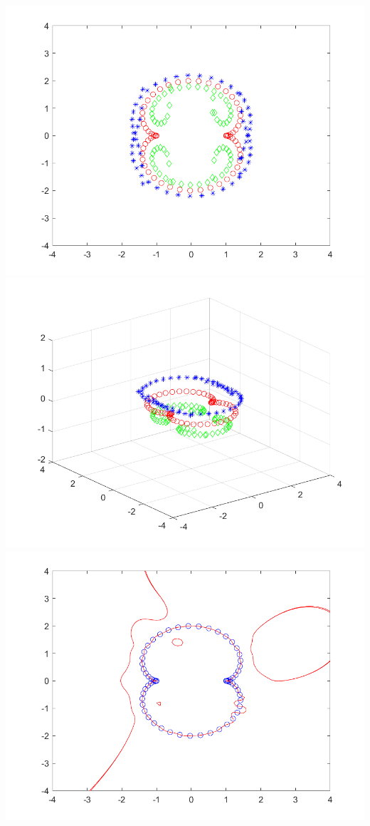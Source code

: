 \begin{solution}
\begin{center}
        \includegraphics[scale=0.69]{problem1norm.PNG}
        \includegraphics[scale=0.15]{problem1ext.PNG}
        \includegraphics[scale=0.69]{problem1lvl.PNG}

    \end{center}

\end{solution}

\newpage
